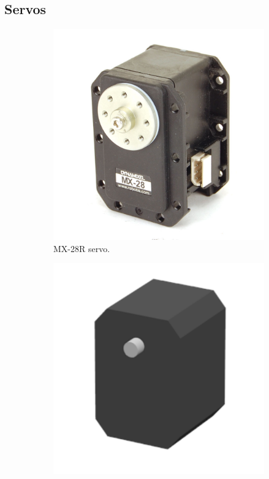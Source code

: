 \subsection{Servos}
\begin{figure}[htp]
\center
\begin{subfigure}[b]{0.3\textwidth}
    \includegraphics[width = \textwidth]{figures/mx28}
    \caption{MX-28R servo.}
    \label{fig:mx28}
\end{subfigure}
\hfill
\begin{subfigure}[b]{0.3\textwidth}
    \includegraphics[width = \textwidth]{figures/mx28_model}

\end{subfigure}
\end{figure}
